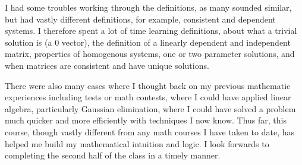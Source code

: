 \documentclass[11pt, letterpaper, twoside]{article}
\begin{document}
\vspace{2mm}
I had some troubles working through the definitions, as many sounded similar, but had vastly different definitions, for example, consistent and dependent systems.
I therefore spent a lot of time learning definitions, about what a trivial solution is (a 0 vector), the definition of a linearly dependent and independent matrix, properties of homogenous systems, one or two parameter solutions, and when matrices are consistent and have unique solutions. 

\vspace{2mm}
There were also many cases where I thought back on my previous mathematic experiences including tests or math contests, where I could have applied linear algebra, particularly Gaussian elimination, where I could have solved a problem much quicker and more efficiently with techniques I now know.
Thus far, this course, though vastly different from any math courses I have taken to date, has helped me build my mathematical intuition and logic. I look forwards to completing the second half of the class in a timely manner. 
\end{document}
